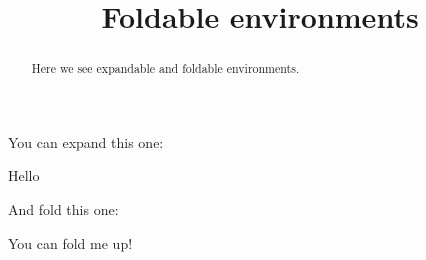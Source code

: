 \documentclass{ximera}
\title{Foldable environments}
\begin{document}
\begin{abstract}
  Here we see expandable and foldable environments.
\end{abstract}
\maketitle

You can expand this one:

\begin{expandable}
  Hello
 \begin{center}
 \end{center}
\end{expandable}



And fold this one:

\begin{foldable}
  You can fold me up!
\end{foldable}
\end{document}
